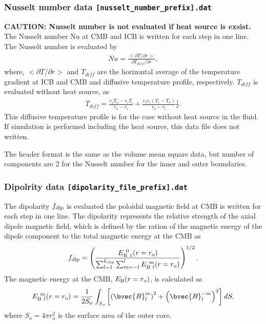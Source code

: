\subsubsection{Nusselt number data {\tt [nusselt\_number\_prefix].dat}}
{\bf CAUTION: Nusselt number is not evaluated if heat source is exsist.}
The Nusselt number Nu at CMB and ICB is written for each step in one line. The Nusselt number is evaluated by
%
\begin{eqnarray*}
Nu = \frac{<\partial T / \partial r>}{\partial T_{diff}/ \partial r},
\end{eqnarray*}
where, $<\partial T / \partial r>$ and $T_{diff}$ are the horizontal average of the temperature gradient at ICB and CMB and diffusive temperature profile, respectively. $T_{diff}$ is evaluated without heat source, as
\begin{eqnarray*}
T_{diff} = \frac{r_{o}T_{o} - r_{i}T_{i}}{r_{o} - r_{i}}
    +  \frac{r_{o}r_{i}\left(T_{i} - T_{o}\right)}{r_{o} - r_{i}} \frac{1}{r}.
\end{eqnarray*}
%
This diffusive temperature profile is for the case without heat source in the fluid. If simulation is performed including the heat source, this data file does not written.

The header format is the same as the volume mean square data, but number of components are 2 for the Nusselt number for the inner and outer boundaries.

\subsubsection{Dipolrity data {\tt [dipolarity\_file\_prefix].dat}}
The dipolarity $f_{\rm dip}$ is evaluated the poloidal magnetic field at CMB is written for each step in one line. The dipolarity represents the relative strength of the axial dipole magnetic field, which is defined by the ration of the magnetic energy of the dipole component to the total magnetic energy at the CMB as
%
\begin{equation}
f_{\rm dip} = 
\left(
\frac{E_{{\rm B}\ 1}^{\ 0} (r=r_o)}
     {\sum_{l=1}^{L_{\rm dip}}
      \sum_{m=-l}^l E_{{\rm B}\ l}^{\ m} (r=r_o)}
\right)^{1/2}.
\label{eq:f_dip}
\end{equation}
%
The magnetic energy at the CMB, $E_{\rm B} (r=r_o)$, is calculated as
%
\begin{equation}
E_{{\rm B}\ l}^{\ m} (r=r_o) = 
  \frac{1}{2S_o} \int_{S_o} \left[
  \left(\bvec{B}_{l}^{m} \right)^2 + \left(\bvec{B}_{l}^{-m} \right)^2 \right] dS,
\end{equation}
%
where $S_o = 4\pi r_o^2$ is the surface area of the outer core.

